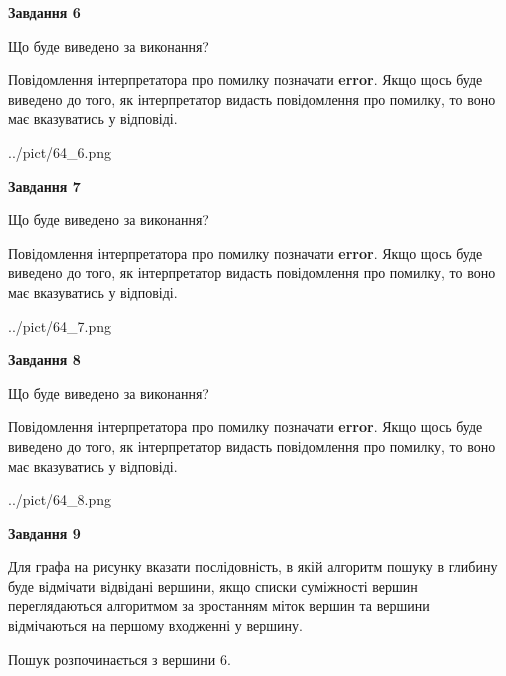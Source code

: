\documentclass[12pt, ukrainian]{article}
\begin{document}
{\begin {large}
{\begin {center}\textbf{Завдання 6}\end {center}}\par
Що буде виведено за виконання?

Повідомлення інтерпретатора про помилку позначати \textbf{error}.
Якщо щось буде виведено до того, як інтерпретатор видасть повідомлення про помилку, 
то воно має вказуватись у відповіді. \par


\begin{center}
	{../pict/64_6.png}
\end{center}
\newpage

{\begin {center}\textbf{Завдання 7}\end {center}}\par
Що буде виведено за виконання?

Повідомлення інтерпретатора про помилку позначати \textbf{error}.
Якщо щось буде виведено до того, як інтерпретатор видасть повідомлення про помилку, 
то воно має вказуватись у відповіді. \par


\begin{center}
	{../pict/64_7.png}
\end{center}
\newpage

{\begin {center}\textbf{Завдання 8}\end {center}}\par
Що буде виведено за виконання?

Повідомлення інтерпретатора про помилку позначати \textbf{error}.
Якщо щось буде виведено до того, як інтерпретатор видасть повідомлення про помилку, 
то воно має вказуватись у відповіді. \par


\begin{center}
	{../pict/64_8.png}
\end{center}
\newpage

{\begin {center}\textbf{Завдання 9}\end {center}}\par
Для графа на рисунку вказати послідовність, в якій алгоритм пошуку в глибину буде відмічати відвідані вершини, якщо списки суміжності вершин переглядаються алгоритмом за зростанням міток вершин та вершини відмічаються на першому вход\-женні у вершину.\par
Пошук розпочинається з вершини 6.\par


\end{large}}
\end{document}
